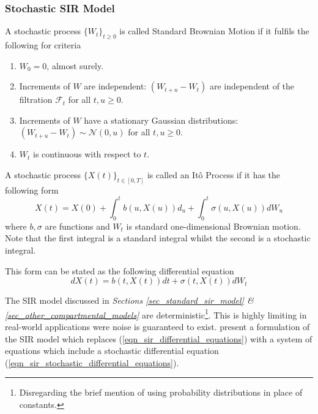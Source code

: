 \documentclass[11pt,a4paper]{article}
\theoremstyle{break}
\begin{document}
\subsubsection{Stochastic SIR Model}

  \begin{box_definition}
    A stochastic process $\{W_t\}_{t\geq0}$ is called Standard Brownian Motion if it fulfils the following for criteria
    \begin{enumerate}
      \item $W_0=0$, almost surely.
      \item Increments of $W$ are independent: $(W_{t+u}-W_t)$ are independent of the filtration $\mathcal{F}_t$ for all $t,u\geq0$.
      \item Increments of $W$ have a stationary Gaussian distributions: $(W_{t+u}-W_t)\sim\mathcal{N}(0,u)$ for all $t,u\geq0$.
      \item $W_t$ is continuous with respect to $t$.
    \end{enumerate}
  \end{box_definition}

  \begin{box_definition}[It\^o Process]
    A stochastic process $\{X(t)\}_{t\in[0,T]}$ is called an It\^o Process if it has the following form
    \[ X(t)=X(0)+\int_0^tb(u,X(u))d_u+\int_0^t\sigma(u,X(u))dW_u \]
    where $b,\sigma$ are functions and $W_t$ is standard one-dimensional Brownian motion. Note that the first integral is a standard integral whilst the second is a stochastic integral.
    \par This form can be stated as the following differential equation
    \[ dX(t)=b(t,X(t))dt+\sigma(t,X(t))dW_t \]
  \end{box_definition}

  \par The SIR model discussed in \textit{Sections \ref{sec_standard_sir_model} \& \ref{sec_other_compartmental_models}} are deterministic\footnote{Disregarding the brief mention of using probability distributions in place of constants.}. This is highly limiting in real-world applications were noise is guaranteed to exist.  \cite[]{infectious_disease_spread_analysis_using_sdes} present a formulation of the SIR model which replaces (\ref{eqn_sir_differential_equations}) with a system of equations which include a stochastic differential equation (\ref{eqn_sir_stochastic_differential_equations}).
\end{document}
